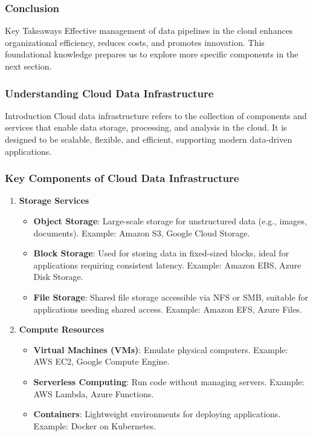 \documentclass[aspectratio=169]{beamer}
\begin{document}
\begin{frame}[fragile]
    \frametitle{Conclusion}
    \begin{block}{Key Takeaways}
        Effective management of data pipelines in the cloud enhances organizational efficiency, reduces costs, and promotes innovation. This foundational knowledge prepares us to explore more specific components in the next section.
    \end{block}
\end{frame}

\begin{frame}[fragile]
    \frametitle{Understanding Cloud Data Infrastructure}
    \begin{block}{Introduction}
        Cloud data infrastructure refers to the collection of components and services that enable data storage, processing, and analysis in the cloud. It is designed to be scalable, flexible, and efficient, supporting modern data-driven applications.
    \end{block}
\end{frame}

\begin{frame}[fragile]
    \frametitle{Key Components of Cloud Data Infrastructure}
    \begin{enumerate}
        \item \textbf{Storage Services}
            \begin{itemize}
                \item \textbf{Object Storage}: Large-scale storage for unstructured data (e.g., images, documents). Example: Amazon S3, Google Cloud Storage.
                \item \textbf{Block Storage}: Used for storing data in fixed-sized blocks, ideal for applications requiring consistent latency. Example: Amazon EBS, Azure Disk Storage.
                \item \textbf{File Storage}: Shared file storage accessible via NFS or SMB, suitable for applications needing shared access. Example: Amazon EFS, Azure Files.
            \end{itemize}
        \item \textbf{Compute Resources}
            \begin{itemize}
                \item \textbf{Virtual Machines (VMs)}: Emulate physical computers. Example: AWS EC2, Google Compute Engine.
                \item \textbf{Serverless Computing}: Run code without managing servers. Example: AWS Lambda, Azure Functions.
                \item \textbf{Containers}: Lightweight environments for deploying applications. Example: Docker on Kubernetes.
            \end{itemize}
    \end{enumerate}
\end{frame}
\end{document}
